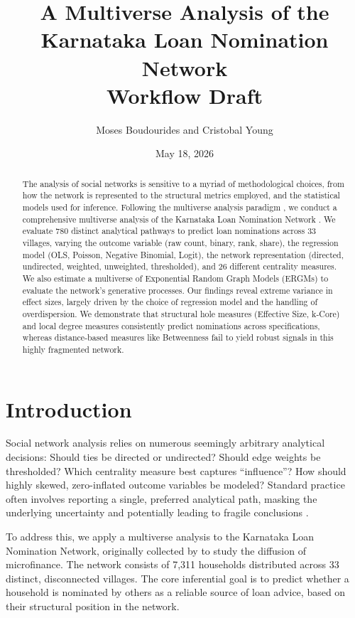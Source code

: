 \documentclass[11pt,a4paper]{article}
\title{A Multiverse Analysis of the Karnataka Loan Nomination Network\\[2ex]
\Large {\textbf{Workflow Draft}}}
\author{Moses Boudourides and Cristobal Young}
\date{May 18, 2026}
\begin{document}
\maketitle

\begin{abstract}
The analysis of social networks is sensitive to a myriad of methodological choices, from how the network is represented to the structural metrics employed, and the statistical models used for inference. Following the multiverse analysis paradigm \citep{YoungCumberworth2025, Steegen2016}, we conduct a comprehensive multiverse analysis of the Karnataka Loan Nomination Network \citep{BanerjeeEtAl2013}. We evaluate 780 distinct analytical pathways to predict loan nominations across 33 villages, varying the outcome variable (raw count, binary, rank, share), the regression model (OLS, Poisson, Negative Binomial, Logit), the network representation (directed, undirected, weighted, unweighted, thresholded), and 26 different centrality measures. We also estimate a multiverse of Exponential Random Graph Models (ERGMs) to evaluate the network's generative processes. Our findings reveal extreme variance in effect sizes, largely driven by the choice of regression model and the handling of overdispersion. We demonstrate that structural hole measures (Effective Size, k-Core) and local degree measures consistently predict nominations across specifications, whereas distance-based measures like Betweenness fail to yield robust signals in this highly fragmented network.
\end{abstract}

\section{Introduction}
Social network analysis relies on numerous seemingly arbitrary analytical decisions: Should ties be directed or undirected? Should edge weights be thresholded? Which centrality measure best captures ``influence''? How should highly skewed, zero-inflated outcome variables be modeled? Standard practice often involves reporting a single, preferred analytical path, masking the underlying uncertainty and potentially leading to fragile conclusions \citep{DelGiudice2021}.

To address this, we apply a multiverse analysis \citep{Simonsohn2020} to the Karnataka Loan Nomination Network, originally collected by \citet{BanerjeeEtAl2013} to study the diffusion of microfinance. The network consists of 7,311 households distributed across 33 distinct, disconnected villages. The core inferential goal is to predict whether a household is nominated by others as a reliable source of loan advice, based on their structural position in the network.
\end{document}
